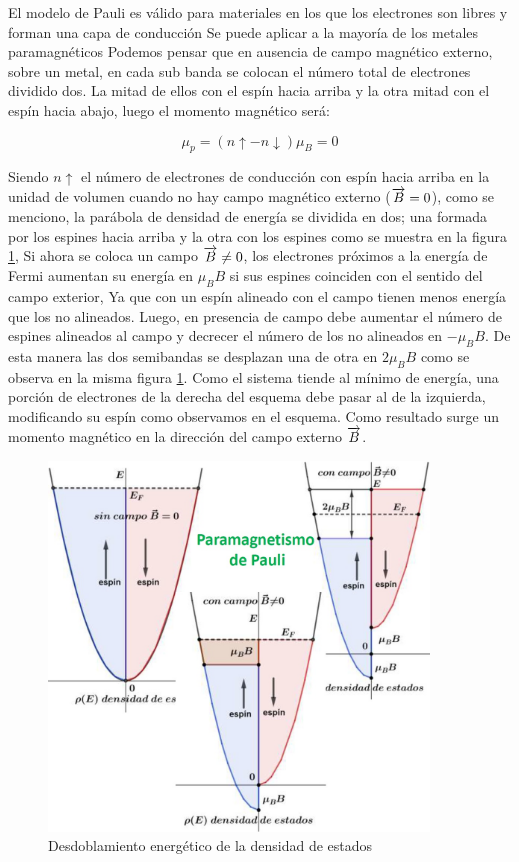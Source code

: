 El modelo de Pauli es válido para materiales en los que los electrones son libres y forman una capa de conducción Se puede aplicar a la mayoría de los metales paramagnéticos Podemos pensar que en ausencia de campo magnético externo, sobre un metal, en cada sub banda se colocan el número total de electrones dividido dos. La
mitad de ellos con el espín hacia arriba y la otra mitad con el espín hacia abajo, luego el momento magnético será:

\begin{equation}
	\mu_{p}= (n\uparrow - n\downarrow)\mu_{B} = 0
\end{equation}

Siendo $n\uparrow$ el número de electrones de conducción con espín hacia arriba en la unidad de volumen cuando no hay campo magnético externo ($\overrightarrow{B}=0$), como se menciono, la parábola de densidad de energía se dividida en dos; una formada por los espines hacia arriba y la otra con los espines como se muestra en la figura \ref{fig:s16}, Si ahora se coloca un campo $\overrightarrow{B}\neq 0$, los electrones próximos a la energía de Fermi aumentan su energía en $\mu_{B}B$ si sus espines coinciden con el sentido del campo exterior, Ya que con un espín alineado con el campo tienen menos energía que los no
alineados. Luego, en presencia de campo debe aumentar el número de espines alineados al campo y decrecer el número de los no alineados en  $-\mu_{B}B$. De esta manera las dos semibandas se desplazan una de otra en  $2\mu_{B}B$ como se observa en la misma figura \ref{fig:s16}. Como el sistema tiende al mínimo de energía, una porción de electrones de la derecha del esquema debe pasar al de la izquierda, modificando su espín como observamos en el esquema. Como resultado surge un momento magnético en la dirección del campo externo $\overrightarrow{B}$.

\begin{figure}[H]
    \centering
    \includegraphics[width=0.9\textwidth]{./Figures/fig_s16}
	\caption{Desdoblamiento energético de la densidad de estados}
	\label{fig:s16}
\end{figure}





